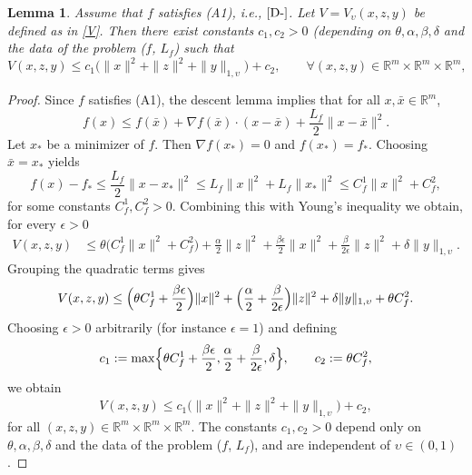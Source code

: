 \documentclass[11pt, a4paper,leqno]{amsart}
\newtheorem{lemma}{Lemma}[section]
\theoremstyle{definition}
\numberwithin{equation}{section}
\newcommand{\R}{\mathbb R}
\begin{document}
\begin{lemma}\label{bog} Assume that $f$ satisfies \textnormal{(A1)}, i.e., $\eqref{D-}$. Let $V=V_\upsilon(x,z,y)$ be defined as in \eqref{V}. Then  there exist constants $c_1,c_2>0$ (depending on $\theta,\alpha,\beta,\delta$ and the data of the problem ($f$,  $L_f$) such that
\begin{equation}\label{Vlla}
V(x,z,y)\leq c_1\bigl(\|x\|^2+\|z\|^2+\|y\|_{1,\upsilon}\bigr) + c_2, \qquad \forall (x,z,y)\in\R^{m}\times \R^m\times \R^m,
\end{equation}
\end{lemma}
\begin{proof} Since $f$ satisfies \textnormal{(A1)}, the descent lemma implies that for all $x,\bar x\in\R^m$,
\[
f(x)\le f(\bar x)+\nabla f(\bar x)\cdot(x-\bar x)
+\frac{L_f}{2}\|x-\bar x\|^2 .
\]
Let $x_\ast$ be a minimizer of $f$. Then $\nabla f(x_\ast)=0$ and $f(x_\ast)=f_\ast$. Choosing $\bar x=x_\ast$ yields
\[
f(x)-f_\ast
\le \frac{L_f}{2}\|x-x_\ast\|^2\le L_f\|x\|^2 + L_f\|x_\ast\|^2\le C_f^1 \|x\|^2 + C_f^2,
\]
for some constants $C_f^1,C_f^2>0$.  Combining this with  Young's inequality we obtain, for every $\epsilon>0$
\[
\begin{aligned}
V(x,z,y)
&\le \theta\bigl(C_f^1\|x\|^2 + C_f^2\bigr)
+\frac{\alpha}{2}\|z\|^2
+\frac{\beta\epsilon}{2}\|x\|^2
+\frac{\beta}{2\epsilon}\|z\|^2
+\delta\|y\|_{1,\upsilon} .
\end{aligned}
\]
Grouping the quadratic terms gives
\[
V(x,z,y)
\le
\Bigl(\theta C_f^1 + \frac{\beta\epsilon}{2}\Bigr)\|x\|^2
+
\Bigl(\frac{\alpha}{2}+\frac{\beta}{2\epsilon}\Bigr)\|z\|^2
+
\delta\|y\|_{1,\upsilon}
+
\theta C_f^2 .
\]
Choosing $\epsilon>0$ arbitrarily (for instance $\epsilon=1$) and defining
\[
c_1
:=
\max\Bigl\{
\theta C_f^1 + \frac{\beta\epsilon}{2},
\frac{\alpha}{2}+\frac{\beta}{2\epsilon},
\delta
\Bigr\},
\qquad
c_2:=\theta C_f^2,
\]
we obtain
\[
V(x,z,y)
\le c_1\bigl(\|x\|^2+\|z\|^2+\|y\|_{1,\upsilon}\bigr)
+ c_2 ,
\]
for all $(x,z,y)\in\R^m\times\R^m\times\R^m$. The constants $c_1,c_2>0$ depend only on
$\theta,\alpha,\beta,\delta$ and the data of the problem
($f$, $L_f$), and are independent of $\upsilon\in(0,1)$.
\end{proof}
\end{document}
